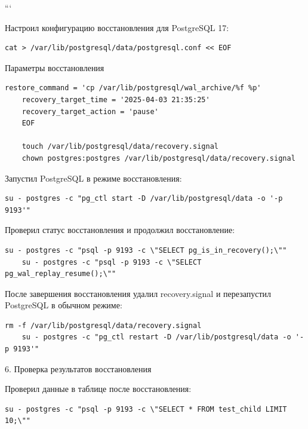 \documentclass{article}
\begin{document}
```

Настроил конфигурацию восстановления для PostgreSQL 17:
\begin{lstlisting}[caption={kitty}, label={lst:example}]
    cat > /var/lib/postgresql/data/postgresql.conf << EOF

\end{lstlisting}
Параметры восстановления
\begin{lstlisting}[caption={kitty}, label={lst:example}]
    restore_command = 'cp /var/lib/postgresql/wal_archive/%f %p'
    recovery_target_time = '2025-04-03 21:35:25'
    recovery_target_action = 'pause'
    EOF

    touch /var/lib/postgresql/data/recovery.signal
    chown postgres:postgres /var/lib/postgresql/data/recovery.signal
\end{lstlisting}


Запустил PostgreSQL в режиме восстановления:
\begin{lstlisting}[caption={kitty}, label={lst:example}]
    su - postgres -c "pg_ctl start -D /var/lib/postgresql/data -o '-p 9193'"
\end{lstlisting}
Проверил статус восстановления и продолжил восстановление:
\begin{lstlisting}[caption={kitty}, label={lst:example}]
    su - postgres -c "psql -p 9193 -c \"SELECT pg_is_in_recovery();\""
    su - postgres -c "psql -p 9193 -c \"SELECT pg_wal_replay_resume();\""
\end{lstlisting}


После завершения восстановления удалил recovery.signal и перезапустил PostgreSQL в обычном режиме:
\begin{lstlisting}[caption={kitty}, label={lst:example}]
    rm -f /var/lib/postgresql/data/recovery.signal
    su - postgres -c "pg_ctl restart -D /var/lib/postgresql/data -o '-p 9193'"  
\end{lstlisting}


6. Проверка результатов восстановления

Проверил данные в таблице после восстановления:
\begin{lstlisting}[caption={kitty}, label={lst:example}]
    su - postgres -c "psql -p 9193 -c \"SELECT * FROM test_child LIMIT 10;\""
\end{lstlisting}
\end{document}
